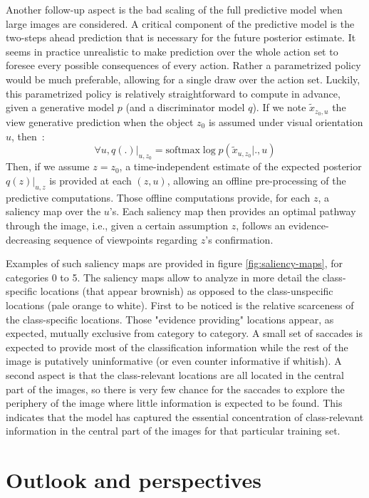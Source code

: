 \documentclass{article} %
\begin{document}
Another follow-up aspect is the bad scaling of the full predictive model when large images are considered. A critical component of the predictive model is the two-steps ahead prediction that is necessary for the future posterior estimate. It seems in practice unrealistic to make prediction over the whole action set to foresee every possible consequences of every action. Rather a parametrized policy would be much preferable, allowing for a single draw over the action set.
Luckily, this parametrized policy is relatively straightforward to compute in advance, given a generative model $p$ (and a discriminator model $q$). If we note $\tilde{x}_{z_0,u}$ the view generative prediction when the object $z_0$ is assumed under visual orientation $u$, then~:
$$\forall u, q(.)|_{u, z_0} = \text{softmax} \log p(\tilde{x}_{u, z_0}|.,u)$$
Then, if we assume $z = z_0$, a time-independent estimate of the expected posterior $q(z)|_{u, z}$ is provided at each $(z, u)$, allowing an offline pre-processing of the predictive computations. Those offline computations provide, for each $z$, a saliency map over the $u$'s. Each saliency map then provides an optimal pathway through the image, i.e., given a certain assumption $z$, follows an evidence-decreasing sequence of viewpoints regarding $z$'s confirmation.  

Examples of such saliency maps are provided in figure \ref{fig:saliency-maps}, for categories 0 to 5. The saliency maps allow to analyze in more detail the class-specific locations (that appear brownish) as opposed to the class-unspecific locations (pale orange to white). First to be noticed is the relative scarceness of the class-specific locations. Those "evidence providing" locations appear, as expected, mutually exclusive from category to category. A small set of saccades is expected to provide most of the classification information while the rest of the image is putatively uninformative (or even counter informative if whitish). A second aspect is that the class-relevant locations are all located in the central part of the images, so there is very few chance for the saccades to explore the periphery of the image where little information is expected to be found. This indicates that the model has captured the essential concentration of class-relevant information in the central part of the images for that particular training set.

\section{Outlook and perspectives}
\end{document}
